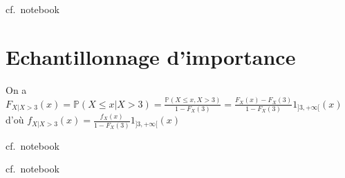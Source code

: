\label{V-answer-melloi2}
cf.~notebook

\section{Echantillonnage
d'importance}\label{V-echantillonnage-dimportance-3}

\label{V-answer-echimp1}
On a
\(F_{X|X>3}(x) = \mathbb{P}(X \leq x |X > 3) = \frac{\mathbb{P}(X\leq x, X>3)}{1-F_X(3)} = \frac{F_X(x)-F_X(3)}{1-F_X(3)}1_{]3,+\infty[}(x)\)
d'où \(f_{X|X>3}(x) = \frac{f_X(x)}{1-F_X(3)}1_{]3,+\infty[}(x)\)

\label{V-answer-echimp2}
cf.~notebook

\label{V-answer-echimp3}
cf.~notebook
